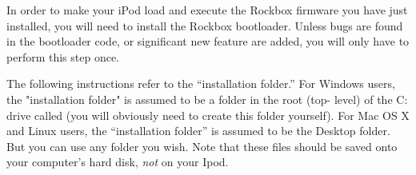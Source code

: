 

In order to make your iPod load and execute the Rockbox firmware you have just 
installed, you will need to install the Rockbox bootloader. Unless bugs are 
found in the bootloader code, or significant new feature are added, you will 
only have to perform this step once.

The following instructions refer to the ``installation folder.''  For Windows 
users, the "installation folder" is assumed to be a folder in the root (top-
level) of the C: drive called  (you will obviously need to 
create this folder yourself).  For Mac OS X and Linux users, the ``installation 
folder'' is assumed to be the Desktop folder. But you can use any folder 
you wish. Note that these files should be saved onto your computer's hard disk, 
\emph{not} on your Ipod. 

